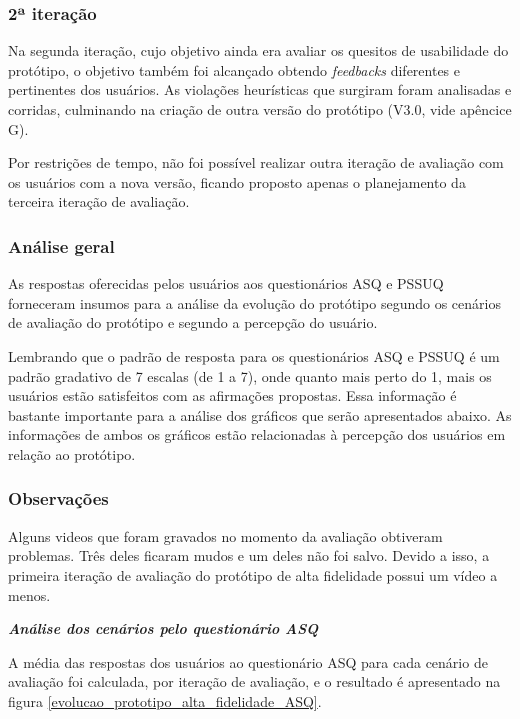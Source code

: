       \subsubsection{2ª iteração}
	
	Na segunda iteração, cujo objetivo ainda era avaliar os quesitos de usabilidade do protótipo, o objetivo também
	foi alcançado obtendo \textit{feedbacks} diferentes e pertinentes dos usuários. As violações heurísticas que surgiram
	foram analisadas e corridas, culminando na criação de outra versão do protótipo (V3.0, vide apêncice G).
	
	Por restrições 
	de tempo, não foi possível realizar outra iteração de avaliação com os usuários com a nova versão, ficando proposto apenas
	o planejamento da terceira iteração de avaliação.
      
      \subsubsection{Análise geral}
	
	As respostas oferecidas pelos usuários aos questionários ASQ e PSSUQ forneceram insumos para a análise da
	evolução do protótipo segundo os cenários de avaliação do protótipo e segundo a percepção do usuário.
	
	Lembrando que o padrão de resposta para os questionários ASQ e PSSUQ é um padrão gradativo de 7 escalas (de 1 a 7),
	onde quanto mais perto do 1, mais os usuários estão satisfeitos com as afirmações propostas. Essa informação é 
	bastante importante para a análise dos gráficos que serão apresentados abaixo. As informações de ambos os gráficos 
	estão relacionadas à percepção dos usuários em relação ao protótipo.\\
	
      \subsubsection{Observações}
    
	Alguns videos que foram gravados no momento da avaliação obtiveram problemas. Três deles ficaram mudos e um deles não 
	foi salvo. Devido a isso, a primeira iteração de avaliação do protótipo de alta fidelidade possui um vídeo a menos.
	
	\noindent
	\emph{\textbf{Análise dos cenários pelo questionário ASQ}}
	
	A média das respostas dos usuários ao questionário ASQ para cada cenário de avaliação foi calculada, por
	iteração de avaliação, e o resultado é apresentado na figura \ref{evolucao_prototipo_alta_fidelidade_ASQ}.
	
